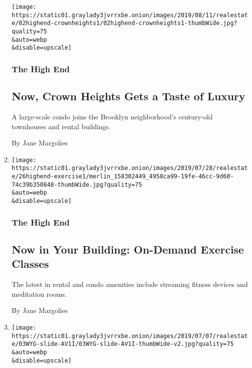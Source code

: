 \begin{enumerate}
  \texttt{[image: https://static01.graylady3jvrrxbe.onion/images/2019/08/11/realestate/02highend-crownheights1/02highend-crownheights1-thumbWide.jpg?quality=75\\\&auto=webp\\\&disable=upscale]}

  \hypertarget{the-high-end-6}{%
  \subsubsection{The High End}\label{the-high-end-6}}

  \hypertarget{now-crown-heights-gets-a-taste-of-luxury-1}{%
  \subsection{Now, Crown Heights Gets a Taste of
  Luxury}\label{now-crown-heights-gets-a-taste-of-luxury-1}}

  A large-scale condo joins the Brooklyn neighborhood's century-old
  townhouses and rental buildings.

  By Jane Margolies
\item
  \href{/2019/07/26/realestate/now-in-your-building-on-demand-exercise-classes.html}{}

  \texttt{[image: https://static01.graylady3jvrrxbe.onion/images/2019/07/28/realestate/26highend-exercise1/merlin\_158302449\_4958ca99-19fe-46cc-9d60-74c39b350848-thumbWide.jpg?quality=75\\\&auto=webp\\\&disable=upscale]}

  \hypertarget{the-high-end-7}{%
  \subsubsection{The High End}\label{the-high-end-7}}

  \hypertarget{now-in-your-building-on-demand-exercise-classes}{%
  \subsection{Now in Your Building: On-Demand Exercise
  Classes}\label{now-in-your-building-on-demand-exercise-classes}}

  The latest in rental and condo amenities include streaming fitness
  devices and meditation rooms.

  By Jane Margolies
\item
  \href{/2019/07/03/realestate/5-5-million-homes-in-new-york-illinois-and-missouri.html}{}

  \texttt{[image: https://static01.graylady3jvrrxbe.onion/images/2019/07/07/realestate/03WYG-slide-AV1I/03WYG-slide-AV1I-thumbWide-v2.jpg?quality=75\\\&auto=webp\\\&disable=upscale]}


\end{enumerate}
